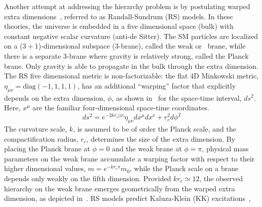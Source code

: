 Another attempt at addressing the hierarchy problem is by postulating warped extra dimensions~\cite{warped_xtra_dim_1,warped_xtra_dim_2,warped_xtra_dim_3}, referred to as Randall-Sundrum (RS) models. In these theories, the universe is embedded in a five dimensional space (bulk) with constant negative scalar curvature (anti-de Sitter).
The SM particles are localized on a ($3+1$)-dimensional subspace (3-brane), called the weak or \TeV\, brane, while there is a separate 3-brane where gravity is relatively strong, called the Planck brane. Only gravity is able to propagate in the bulk through the extra dimension.
The RS five dimensional metric is non-factorizable: the flat 4D Minkowski metric, $\eta_{\mu\nu}=\textrm{diag}(-1,1,1,1)$, has an additional ``warping'' factor that explicitly depends on the extra dimension, $\phi$, as shown in~\Eqn{\ref{eq:rs_metric}} for the space-time interval, $ds^2$. Here, $x^{\mu}$ are the familiar four-dimensional space-time coordinates.
\begin{equation}
ds^2=e^{-2kr_c|\phi|}\eta_{\mu\nu}dx^{\mu}dx^{\nu}+ r_c^2d\phi^2
\label{eq:rs_metric}
\end{equation}
The curvature scale, $k$, is assumed to be of order the Planck scale, and the compactification radius, $r_c$, determines the size of the extra dimension.
By placing the Planck brane at $\phi=0$ and the weak brane at $\phi=\pi$, physical mass parameters on the weak brane accumulate a warping factor with respect to their higher dimensional values, $m=e^{-kr_c\pi}m_0$, while the Planck scale on a brane depends only weakly on the fifth dimension. Provided $kr_c\simeq 12$, the observed hierarchy on the weak brane emerges geometrically from the warped extra dimension, as depicted in~\Fig{\ref{fig:rs_branes}}. RS models predict Kaluza-Klein (KK) excitations~\cite{kaluza_klein_mode},
